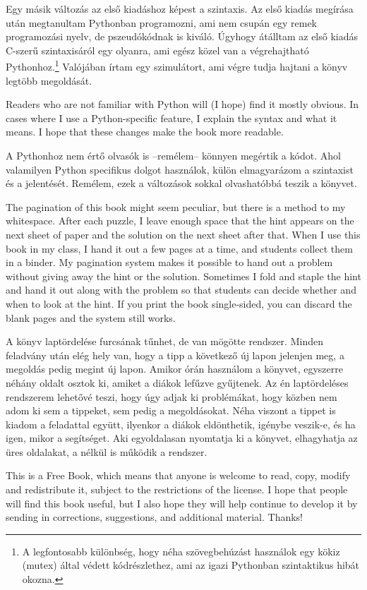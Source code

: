 \documentclass{book}
\begin{document}
Egy másik változás az első kiadáshoz képest a szintaxis. Az első kiadás
megírása után megtanultam Pythonban programozni, ami nem csupán egy
remek programozási nyelv, de pszeudókódnak is kiváló. Úgyhogy
átálltam az első kiadás C-szerű szintaxisáról egy olyanra, ami
egész közel van a végrehajtható Pythonhoz.\footnote{A legfontosabb
különbség, hogy néha szövegbehúzást használok egy kökiz (mutex) által
védett kódrészlethez, ami az igazi Pythonban szintaktikus hibát okozna.}
Valójában írtam egy szimulátort, ami végre tudja hajtani a könyv
legtöbb megoldását.

Readers who are not familiar with Python will (I hope) find it mostly
obvious.  In cases where I use a Python-specific feature, I explain the
syntax and what it means.  I hope that these changes make the book
more readable.

A Pythonhoz nem értő olvasók is --remélem-- könnyen megértik a kódot.
Ahol valamilyen Python specifikus dolgot használok, külön elmagyarázom
a szintaxist és a jelentését. Remélem, ezek a változások sokkal olvashatóbbá
teszik a könyvet.

The pagination of this book might seem peculiar, but there is a method
to my whitespace.  After each puzzle, I leave enough space that the
hint appears on the next sheet of paper and the solution on the next
sheet after that.  When I use this book in my class, I hand it out a
few pages at a time, and students collect them in a binder.  My
pagination system makes it possible to hand out a problem without
giving away the hint or the solution.  Sometimes I fold and staple the
hint and hand it out along with the problem so that students can
decide whether and when to look at the hint.  If you print the book
single-sided, you can discard the blank pages and the system still
works.

A könyv laptördelése furcsának tűnhet, de van mögötte rendszer.
Minden feladvány után elég hely van, hogy a tipp a következő
új lapon jelenjen meg, a megoldás pedig megint új lapon.
Amikor órán használom a könyvet, egyszerre néhány oldalt osztok ki,
amiket a diákok lefűzve gyűjtenek. Az én laptördeléses rendszerem
lehetővé teszi, hogy úgy adjak ki problémákat, hogy közben nem adom
ki sem a tippeket, sem pedig a megoldásokat.
Néha viszont a tippet is kiadom a feladattal együtt, ilyenkor
a diákok eldönthetik, igénybe veszik-e, és
ha igen, mikor a segítséget. Aki egyoldalasan nyomtatja ki a könyvet,
elhagyhatja az üres oldalakat, a nélkül is működik a rendszer.

This is a Free Book, which means that anyone is welcome to read,
copy, modify and redistribute it, subject to the restrictions of the
license.  I hope that people
will find this book useful, but I also hope they will help continue
to develop it by sending in corrections, suggestions, and additional
material.  Thanks!
\end{document}
